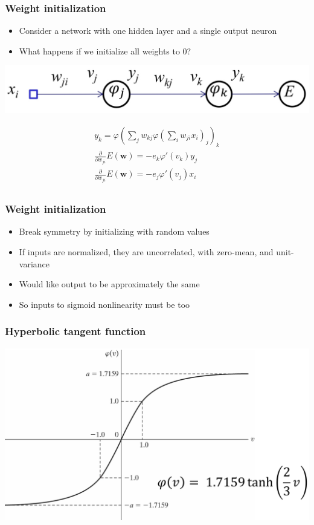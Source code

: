 \documentclass[12pt,notes,mathserif]{beamer}
\begin{document}
\begin{frame}[c]
\frametitle{Weight initialization}
\begin{itemize}
\item Consider a network with one hidden layer and a single output neuron
\item What happens if we initialize all weights to 0?
\end{itemize}
\begin{center}
\includegraphics[width=0.47\linewidth]{fig/lec66.jpg}
\end{center}
\[
\begin{array}{c}
y_k=\varphi\left(\sum\nolimits_jw_{kj}\varphi\left(\sum\nolimits_iw_{ji}x_i\right)_j\right)_k\\
\frac{\partial}{\partial w_{ji}}E(\mathbf{w})=-e_k\varphi'(v_k)y_j\\
\frac{\partial}{\partial w_{ji}}E(\mathbf{w})=-e_j\varphi'(v_j)x_i\\
\end{array}
\]
\end{frame}
\begin{frame}[c]
\frametitle{Weight initialization}
\begin{itemize}
\item Break symmetry by initializing with random values
\item If inputs are normalized, they are uncorrelated, with zero-mean, and unit-variance

\item Would like output to be approximately the same

\item So inputs to sigmoid nonlinearity must be too

\end{itemize}
\end{frame}

\begin{frame}[c]
\frametitle{Hyperbolic tangent function}
\begin{center}
\includegraphics[width=0.95\linewidth]{fig/lec68.jpg}
\end{center}
\end{frame}
\end{document}
